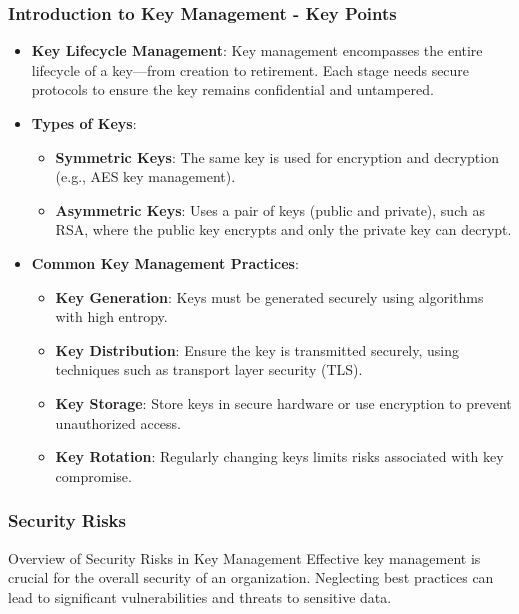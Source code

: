 \documentclass{beamer}
\begin{document}
\begin{frame}[fragile]
    \frametitle{Introduction to Key Management - Key Points}
    \begin{itemize}
        \item \textbf{Key Lifecycle Management}: 
        Key management encompasses the entire lifecycle of a key—from creation to retirement. Each stage needs secure protocols to ensure the key remains confidential and untampered.
        
        \item \textbf{Types of Keys}:
        \begin{itemize}
            \item \textbf{Symmetric Keys}: The same key is used for encryption and decryption (e.g., AES key management).
            \item \textbf{Asymmetric Keys}: Uses a pair of keys (public and private), such as RSA, where the public key encrypts and only the private key can decrypt.
        \end{itemize}
        
        \item \textbf{Common Key Management Practices}:
        \begin{itemize}
            \item \textbf{Key Generation}: Keys must be generated securely using algorithms with high entropy.
            \item \textbf{Key Distribution}: Ensure the key is transmitted securely, using techniques such as transport layer security (TLS).
            \item \textbf{Key Storage}: Store keys in secure hardware or use encryption to prevent unauthorized access.
            \item \textbf{Key Rotation}: Regularly changing keys limits risks associated with key compromise.
        \end{itemize}
    \end{itemize}
\end{frame}

\begin{frame}[fragile]
    \frametitle{Security Risks}
    \begin{block}{Overview of Security Risks in Key Management}
        Effective key management is crucial for the overall security of an organization. Neglecting best practices can lead to significant vulnerabilities and threats to sensitive data.
    \end{block}
\end{frame}
\end{document}

